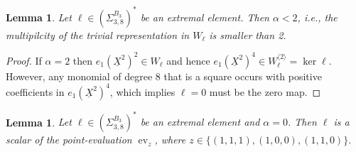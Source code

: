 \documentclass[11pt,a4paper]{amsart}
\numberwithin{equation}{section}
\newtheorem{lemma}[thm]{Lemma}
\theoremstyle{definition}
\DeclareMathOperator{\ev}{ev}
\numberwithin{thm}{section}
\theoremstyle{break}
\numberwithin{subcase}{case}
\begin{document}
 \begin{lemma}\label{le:38Teil1}
 Let $\ell \in \left( \Sigma_{3,8}^{B_3} \right)^\ast$ be an extremal element. Then $\alpha < 2$, i.e., the multipilcity of the trivial representation in $W_\ell$ is smaller than 2.
 \end{lemma}
 \begin{proof}
 If $\alpha = 2$ then $e_1(\underline{X}^2)^2 \in W_\ell$ and hence $e_1(\underline{X}^2)^4 \in  W_\ell^{\langle 2 \rangle} = \ker \ell$. However, any monomial of degree $8$ that is a square occurs with positive coefficients in $e_1(\underline{X}^2)^4$, which implies $\ell = 0$ must be the zero map. 
 \end{proof}
 
 \begin{lemma}\label{le:38Teil2}
 Let $\ell \in \left( \Sigma_{3,8}^{B_3} \right)^\ast$ be an extremal element and $\alpha = 0$. Then $\ell$ is a scalar of the point-evaluation $\ev_z$, where $z \in \{(1,1,1),(1,0,0),(1,1,0)\}.$
 \end{lemma}
\end{document}
